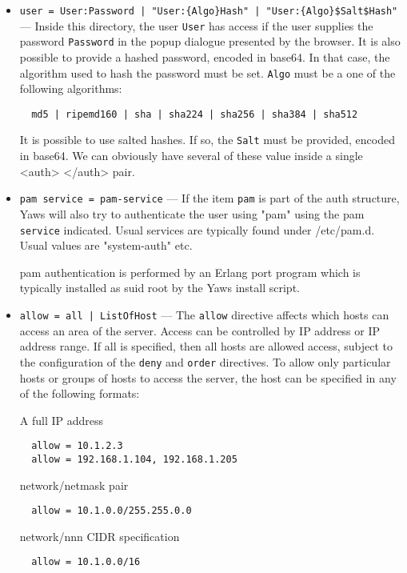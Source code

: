 \documentclass[11pt,oneside,english]{book}
\begin{document}
\begin{itemize}
\begin{itemize}
              \item \verb+user = User:Password | "User:{Algo}Hash" | "User:{Algo}$Salt$Hash"+ ---
                Inside this directory, the user \verb+User+ has access if the
                user supplies the password \verb+Password+ in the popup dialogue
                presented by the browser. It is also possible to provide a
                hashed password, encoded in base64. In that case, the algorithm
                used to hash the password must be set. \verb+Algo+ must be a one
                of the following algorithms:
\begin{verbatim}
  md5 | ripemd160 | sha | sha224 | sha256 | sha384 | sha512
\end{verbatim}
                It is possible to use salted hashes. If so, the \verb+Salt+ must
                be provided, encoded in base64. We can obviously have several of
                these value inside a single <auth> </auth> pair.

              \item \verb+pam service = pam-service+ --- If the item \verb+pam+
                is part of the auth structure, Yaws will also try to
                authenticate the user using "pam" using the pam \verb+service+
                indicated. Usual services are typically found under
                /etc/pam.d. Usual values are "system-auth" etc.

                pam authentication is performed by an Erlang port program which
                is typically installed as suid root by the Yaws install script.

              \item \verb+allow = all | ListOfHost+ --- The \verb+allow+
                directive affects which hosts can access an area of the
                server. Access can be controlled by IP address or IP address
                range. If all is specified, then all hosts are allowed access,
                subject to the configuration of the \verb+deny+ and \verb+order+
                directives. To allow only particular hosts or groups of hosts to
                access the server, the host can be specified in any of the
                following formats:

                A full IP address
\begin{verbatim}
  allow = 10.1.2.3
  allow = 192.168.1.104, 192.168.1.205
\end{verbatim}
                network/netmask pair
\begin{verbatim}
  allow = 10.1.0.0/255.255.0.0
\end{verbatim}
                network/nnn CIDR specification
\begin{verbatim}
  allow = 10.1.0.0/16
\end{verbatim}


\end{itemize}
\end{itemize}
\end{document}
